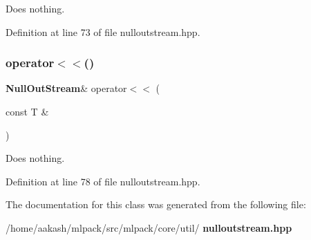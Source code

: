 Does nothing. 



Definition at line 73 of file nulloutstream.\+hpp.

\mbox{\label{classmlpack_1_1util_1_1NullOutStream_a2269feeb99a085e7ef8d3244016bb28b}} 
\subsubsection{operator$<$$<$()\hspace{0.1cm}{\footnotesize\ttfamily [18/18]}}
{\footnotesize\ttfamily \textbf{ Null\+Out\+Stream}\& operator$<$$<$ (\begin{DoxyParamCaption}\item[{const T \&}]{ }\end{DoxyParamCaption})\hspace{0.3cm}{\ttfamily [inline]}}



Does nothing. 



Definition at line 78 of file nulloutstream.\+hpp.



The documentation for this class was generated from the following file\+:\begin{DoxyCompactItemize}
\item 
/home/aakash/mlpack/src/mlpack/core/util/\textbf{ nulloutstream.\+hpp}\end{DoxyCompactItemize}
